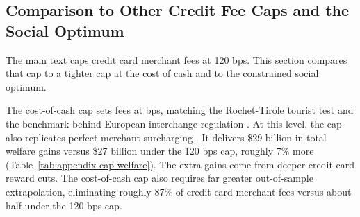 \documentclass[main.tex]{subfiles}
\begin{document}
\clearpage




%     



\subsection{Comparison to Other Credit Fee Caps and the Social Optimum}
\label{subsec:oa-cost-of-cash-cap}
\label{subsec:oa-optimal-prices}

The main text caps credit card merchant fees at 120 bps.
This section compares that cap to a tighter cap at the cost of cash and to the constrained social optimum.

The cost-of-cash cap sets fees at  bps, matching the Rochet-Tirole tourist test \parencite{Rochet.Tirole2006} and the benchmark behind European interchange regulation \parencite{EuropeanCommission2015}.
At this level, the cap also replicates perfect merchant surcharging \parencite{Zenger2011}.
It delivers \$29 billion in total welfare gains versus \$27 billion under the 120 bps cap, roughly 7\% more (Table~\ref{tab:appendix-cap-welfare}).
The extra gains come from deeper credit card reward cuts.
The cost-of-cash cap also requires far greater out-of-sample extrapolation, eliminating roughly 87\% of credit card merchant fees versus about half under the 120 bps cap.
\end{document}
